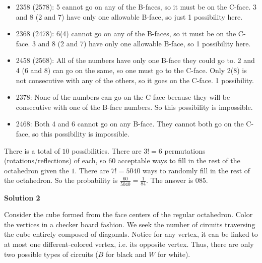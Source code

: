 \begin{enumerate}
            \begin{itemize}
        \item 2358 (2578): 5 cannot go on any of the B-faces, so it must be on the C-face.  3 and 8 (2 and 7) have only one allowable B-face, so just 1 possibility here.
            \end{itemize}
            
            \begin{itemize}
        \item 2368 (2478): 6(4) cannot go on any of the B-faces, so it must be on the C-face.  3 and 8 (2 and 7) have only one allowable B-face, so 1 possibility here.
            \end{itemize}
            
            \begin{itemize}
        \item 2458 (2568): All of the numbers have only one B-face they could go to.  2 and 4 (6 and 8) can go on the same, so one must go to the C-face.  Only 2(8) is not consecutive with any of the others, so it goes on the C-face.  1 possibility.
            \end{itemize}
            
            \begin{itemize}
        \item 2378: None of the numbers can go on the C-face because they will be consecutive with one of the B-face numbers.  So this possibility is impossible.
            \end{itemize}
            
            \begin{itemize}
        \item 2468: Both 4 and 6 cannot go on any B-face.  They cannot both go on the C-face, so this possibility is impossible.
            \end{itemize}
            There is a total of $10$ possibilities.  There are $3!=6$ permutations (rotations/reflections) of each, so $60$ acceptable ways to fill in the rest of the octahedron given the $1$.  There are $7!=5040$ ways to randomly fill in the rest of the octahedron.  So the probability is $\frac {60}{5040} = \frac {1}{84}$. The answer is $\boxed{085}$.

 



\textbf{Solution 2}

Consider the cube formed from the face centers of the regular octahedron. Color the vertices in a checker board fashion. We seek the number of circuits traversing the cube entirely composed of diagonals. Notice for any vertex, it can be linked to at most one different-colored vertex, i.e. its opposite vertex. Thus, there are only two possible types of circuits ($B$ for black and $W$ for white).


\end{enumerate}
